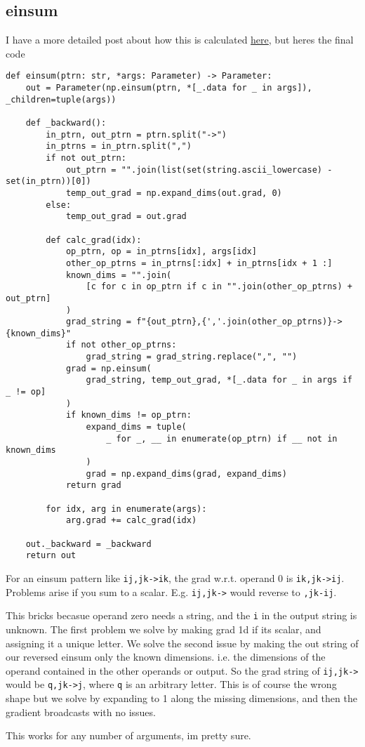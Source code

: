 \documentclass[11pt]{article}
\begin{document}
\subsection{einsum}
I have a more detailed post about how this is calculated \href{https://sammy-snipes.github.io/einsum-gradient/}{here}, but heres the final code 
\begin{verbatim}
def einsum(ptrn: str, *args: Parameter) -> Parameter:
    out = Parameter(np.einsum(ptrn, *[_.data for _ in args]), _children=tuple(args))

    def _backward():
        in_ptrn, out_ptrn = ptrn.split("->")
        in_ptrns = in_ptrn.split(",")
        if not out_ptrn:
            out_ptrn = "".join(list(set(string.ascii_lowercase) - set(in_ptrn))[0])
            temp_out_grad = np.expand_dims(out.grad, 0)
        else:
            temp_out_grad = out.grad

        def calc_grad(idx):
            op_ptrn, op = in_ptrns[idx], args[idx]
            other_op_ptrns = in_ptrns[:idx] + in_ptrns[idx + 1 :]
            known_dims = "".join(
                [c for c in op_ptrn if c in "".join(other_op_ptrns) + out_ptrn]
            )
            grad_string = f"{out_ptrn},{','.join(other_op_ptrns)}->{known_dims}"
            if not other_op_ptrns:
                grad_string = grad_string.replace(",", "")
            grad = np.einsum(
                grad_string, temp_out_grad, *[_.data for _ in args if _ != op]
            )
            if known_dims != op_ptrn:
                expand_dims = tuple(
                    _ for _, __ in enumerate(op_ptrn) if __ not in known_dims
                )
                grad = np.expand_dims(grad, expand_dims)
            return grad

        for idx, arg in enumerate(args):
            arg.grad += calc_grad(idx)

    out._backward = _backward
    return out
\end{verbatim}
For an einsum pattern like
\texttt{ij,jk->ik}, the grad w.r.t. operand 0 is \texttt{ik,jk->ij}. Problems arise if you sum to a scalar. E.g. 
\texttt{ij,jk->} would reverse to \texttt{,jk-ij}. 
\par This bricks becasue operand zero needs a string, and the \texttt{i} in the output string is unknown.
The first problem we solve by making grad 1d if its scalar, and assigning it a unique letter. 
We solve the second issue by making the out string of our reversed einsum only the known dimensions. i.e. the dimensions of the operand contained in the other operands or output. So the grad string of \texttt{ij,jk->} would be 
\texttt{q,jk->j}, where \texttt{q} is an arbitrary letter. 
This is of course the wrong shape but we solve by expanding to 1 along the missing dimensions,
and then the gradient broadcasts with no issues.
\par This works for any number of arguments, im pretty sure.
\end{document}

